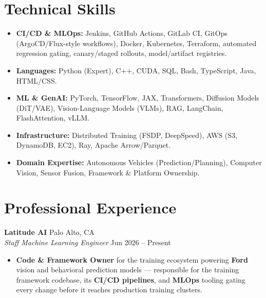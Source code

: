 \documentclass[10pt,letterpaper]{article}
\begin{document}
\section{Technical Skills}
\begin{itemize}
    \item \textbf{CI/CD \& MLOps:} Jenkins, GitHub Actions, GitLab CI, GitOps (ArgoCD/Flux-style workflows), Docker, Kubernetes, Terraform, automated regression gating, canary/staged rollouts, model/artifact registries.
    \item \textbf{Languages:} Python (Expert), C++, CUDA, SQL, Bash, TypeScript, Java, HTML/CSS.
    \item \textbf{ML \& GenAI:} PyTorch, TensorFlow, JAX, Transformers, Diffusion Models (DiT/VAE), Vision-Language Models (VLMs), RAG, LangChain, FlashAttention, vLLM.
    \item \textbf{Infrastructure:} Distributed Training (FSDP, DeepSpeed), AWS (S3, DynamoDB, EC2), Ray, Apache Arrow/Parquet.
    \item \textbf{Domain Expertise:} Autonomous Vehicles (Prediction/Planning), Computer Vision, Sensor Fusion, Framework \& Platform Ownership.
\end{itemize}

\section{Professional Experience}

\textbf{Latitude AI} \hfill Palo Alto, CA \\
\textit{Staff Machine Learning Engineer} \hfill Jun 2026 -- Present
\begin{itemize}
    \item \textbf{Code \& Framework Owner} for the training ecosystem powering \textbf{Ford} vision and behavioral prediction models — responsible for the training framework codebase, its \textbf{CI/CD pipelines}, and \textbf{MLOps} tooling gating every change before it reaches production training clusters.
\end{itemize}
\end{document}
